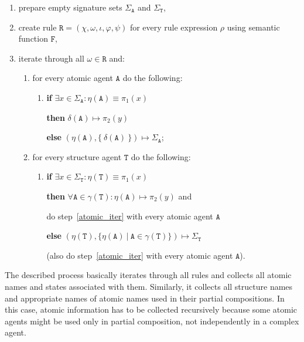 \documentclass[12pt]{fithesis2}
\begin{document}
\begin{enumerate}
\item prepare empty signature sets $\Sigma_\mathtt{A}$ and $\Sigma_\mathtt{T}$, 
\item create rule $\mathtt{R} = (\chi, \omega, \iota, \varphi, \psi)$ for every rule expression $\rho$ using semantic function $\mathtt{F}$,
\item iterate through all $\omega \in \mathtt{R}$ and:
\begin{enumerate}
  \item \label{atomic_iter} for every atomic agent $\mathtt{A}$ do the following:
  	\begin{enumerate}
  		\item \textbf{if} $\exists x \in \Sigma_\mathtt{A}: \eta(\mathtt{A}) \equiv \pi_1(x) $ 

  		\textbf{then} $\delta(\mathtt{A}) \mapsto \pi_2(y)$

  		\textbf{else} $(\eta(\mathtt{A}), \{~\delta(\mathtt{A})~\}) \mapsto \Sigma_\mathtt{A}$;
	\end{enumerate}
  \item \label{structure_iter} for every structure agent $\mathtt{T}$ do the following:
	\begin{enumerate}
	  \item \textbf{if} $\exists x \in \Sigma_\mathtt{T}: \eta(\mathtt{T}) \equiv \pi_1(x) $

	  \textbf{then} $\forall \mathtt{A} \in \gamma(\mathtt{T}): \eta(\mathtt{A}) \mapsto \pi_2(y)$ and 

	  \hspace*{1cm} do step~\ref{atomic_iter} with every atomic agent $\mathtt{A}$

	  \textbf{else} $(\eta(\mathtt{T}), \{ \eta(\mathtt{A}) ~|~ \mathtt{A} \in \gamma(\mathtt{T}) \}) \mapsto \Sigma_\mathtt{T}$ 

	  \hspace*{0.75cm} (also do step~\ref{atomic_iter} with every atomic agent $\mathtt{A}$).
	\end{enumerate}
\end{enumerate}
\end{enumerate}

The described process basically iterates through all rules and collects all atomic names and states associated with them. Similarly, it collects all structure names and appropriate names of atomic names used in their partial compositions. In this case, atomic information has to be collected recursively because some atomic agents might be used only in partial composition, not independently in a complex agent.
\end{document}

